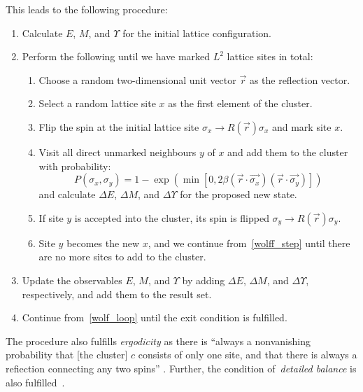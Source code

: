 		This leads to the following procedure:
		\begin{enumerate}
			\item Calculate $E$, $M$, and $\Upsilon$ for the initial lattice configuration.
			\item \label{wolf_loop} Perform the following until we have marked $L^2$ lattice sites in total:
			\begin{enumerate}
				\item Choose a random two-dimensional unit vector $\vec{r}$ as the reflection vector.
				\item Select a random lattice site $x$ as the first element of the cluster.
				\item Flip the spin at the initial lattice site $\sigma_x \rightarrow R(\vec{r}) \sigma_x$ and mark site $x$.
				\item \label{wolff_step} Visit all direct unmarked neighbours $y$ of $x$ and add them to the cluster with probability:
					\begin{equation}\label{eq:wolff}
						P(\sigma_x, \sigma_y) = 1 - \exp(\min[0, 2 \beta (\vec{r}\cdot\vec{\sigma_x}) (\vec{r}\cdot\vec{\sigma_y})])
					\end{equation}
					and calculate $\Delta E$, $\Delta M$, and $\Delta \Upsilon$ for the proposed new state.
				\item If site $y$ is accepted into the cluster, its spin is flipped $\sigma_y \rightarrow R(\vec{r}) \sigma_y$.
				\item Site $y$ becomes the new $x$, and we continue from~\cref{wolff_step} until there are no more sites to add to the cluster.
			\end{enumerate}
			\item Update the observables $E$, $M$, and $\Upsilon$ by adding $\Delta E$, $\Delta M$, and $\Delta \Upsilon$, respectively, and add them to the result set.
			\item Continue from~\cref{wolf_loop} until the exit condition is fulfilled.
		\end{enumerate}
		The procedure also fulfills \emph{ergodicity} as there is \enquote{always a nonvanishing probability that [the cluster] $c$ consists of only one site, and that there is always a refiection connecting any two spins} \citep[p. 361]{wolff}.  Further, the condition of~\emph{detailed balance} is also fulfilled~\cite[eq. 6]{wolff}.
	
